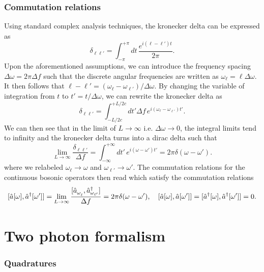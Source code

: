 \subsubsection*{Commutation relations }
Using standard complex analysis techniques, the kronecker delta can be expressed as
\[\delta_{\ell \ell'} =  \int^{+\pi}_{-\pi} dt \, \dfrac{e^{i(\ell - \ell') t}}{2\pi}. \]
Upon the aforementioned assumptions, we can introduce the frequency spacing $\Delta \omega = 2\pi \Delta f$ such that the discrete angular frequencies are written as $\omega_\ell = \ell \Delta \omega$. It then follows that $\ell - \ell' = (\omega_\ell - \omega_{\ell'})/\Delta \omega$. By changing the variable of integration from $t$ to $t' = t / \Delta \omega$, we can rewrite the kronecker delta as
\[\delta_{\ell \ell'} =  \int^{+L/2c}_{-L/2c} dt' \Delta f\, e^{i(\omega_\ell - \omega_{\ell'}) t'}.\]
We can then see that in the limit of $L \to \infty$ i.e. $\Delta \omega \to 0$, the integral limits tend to infinity and the kronecker delta turns into a dirac delta such that
\[ \lim_{L \to \infty} \dfrac{\delta_{\ell \ell'}}{\Delta f} =  \int^{+\infty}_{-\infty} dt'  \, e^{i(\omega- \omega') t'}= 2\pi \delta(\omega - \omega').
\]
where we relabeled $\omega_\ell \to \omega$ and $\omega_{\ell'} \to \omega'$. The commutation relations for the continuous bosonic operators then read
which satisfy the commutation relations
\[
[\hat{a}[\omega], \hat{a}^\dagger[\omega']] = \lim_{L \to \infty} \dfrac{[\hat{a}_{\omega_{\ell\vphantom{'}}}^{\vphantom{\dagger}}, \hat{a}_{\omega_{\ell'}}^\dagger] }{\Delta f} =  2\pi\delta(\omega - \omega'), \quad [\hat{a}[\omega], \hat{a}[\omega']] = [\hat{a}^\dagger[\omega], \hat{a}^\dagger[\omega']] = 0.
\] 



\section*{Two photon formalism}
\subsubsection{Quadratures}

